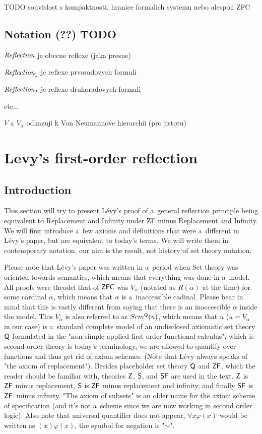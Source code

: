 \documentclass[12pt,a4paper]{article}
\newcommand{\bce}{\begin{compactenum}}
\newcommand{\ece}{\end{compactenum}}
\begin{document}
TODO souvislost s kompaktnosti, hranice formalich systemu nebo alespon ZFC

\subsection{Notation (??) TODO}
\bce
\item $\emph{Reflection}$ je obecne reflexe (jaka presne)
\item $\emph{Reflection}_1$ je reflexe prvoradovych formuli
\item $\emph{Reflection}_2$ je reflexe druhoradovych formuli
\item etc...
\ece

$V$ a $V_\alpha$ odkazuji k Von Neumannove hierarchii (pro jistotu)

\newpage
\section{Levy's first-order reflection}\label{sec:fixed}

\subsection{Introduction}
This section will try to present Lévy's proof of a~general reflection principle being equivalent to Replacement and Infinity under ZF minus Replacement and Infinity.
We will first introduce a~few axioms and definitions that were a~different in Lévy's paper\cite{Levy60a}, but are equivalent to today's terms. We will write them in contemporary notation, our aim is the result, not history of set theory notation. 

Please note that Lévy's paper was written in a~period when Set theory was oriented towards semantics, which means that everything was done in a~model. All proofs were theodel that of $\sf{ZFC}$ was $V_\alpha$ (notated as $R(\alpha)$ at the time) for some cardinal $\alpha$, which means that $\alpha$ is a~inaccessible cadinal. Please bear in mind that this is vastly different from saying that there is an inaccessible $\alpha$ inside the model. This $V_\alpha$ is also referred to as $Scm^{\sf{Q}}(u)$, which means that $u$ ($u=V_\alpha$ in our case) is a~standard complete model of an undisclosed axiomatic set theory $\sf{Q}$ formulated in the "non-simple applied first order functional calculus", which is second-order theory is today's terminology, we are allowed to quantify over functions and thus get rid of axiom schemes. (Note that Lévy always speaks of "the axiom of replacement"). Besides placeholder set theory $\sf{Q}$ and $\sf{ZF}$, which the reader should be familiar with, theories $\sf{Z}$, $\sf{S}$, and $\sf{SF}$ are used in the text. $\sf{Z}$ is $\sf{ZF}$ minus replacement, $\sf{S}$ is $\sf{ZF}$ minus replacement and infinity, and finally $\sf{SF}$ is $\sf{ZF}$ minus infinity. "The axiom of subsets" is an older name for the axiom scheme of specification (and it's not a~scheme since we are now working in second order logic). Also note that universal quantifier does not appear, $\forall x \varphi (x)$ would be written as $(x) \varphi (x)$, the symbol for negation is "$\sim$".
\end{document}
